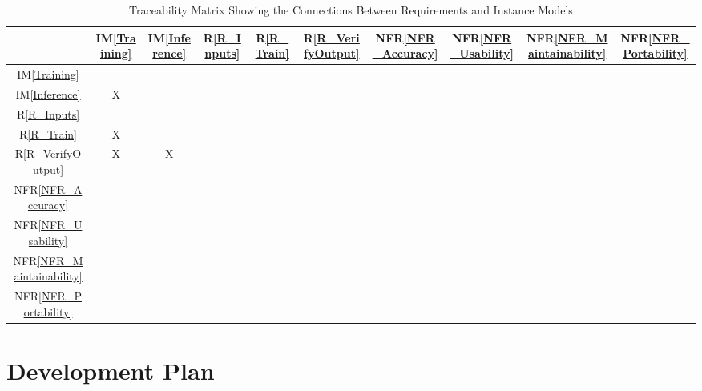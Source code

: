 \documentclass[12pt]{article}
\newcommand{\iref}[1]{IM\ref{#1}}
\newcommand{\rref}[1]{R\ref{#1}}
\newcommand{\nfrref}[1]{NFR\ref{#1}}
\begin{document}
\begin{table}[h!]
\centering
\begin{tabular}{|c|c|c|c|c|c|c|c|c|c|}
\hline
	& \iref{Training} & \iref{Inference} & \rref{R_Inputs} & \rref{R_Train} & \rref{R_VerifyOutput} & \nfrref{NFR_Accuracy} & \nfrref{NFR_Usability} & \nfrref{NFR_Maintainability} & \nfrref{NFR_Portability} \\
\hline
\iref{Training}            &  &  &  &  &  &  &  &  &  \\ \hline
\iref{Inference}           & X &  &  &  &  &  &  &  &  \\ \hline
\rref{R_Inputs}            &  &  &  &  &  &  &  &  &  \\ \hline
\rref{R_Train}             & X &  &  &  &  &  &  &  &  \\ \hline
\rref{R_VerifyOutput}      & X & X &  &  &  &  &  &  &  \\ \hline
\nfrref{NFR_Accuracy}      &  &  &  &  &  &  &  &  &  \\ \hline 
\nfrref{NFR_Usability}     &  &  &  &  &  &  &  &  &  \\ \hline
\nfrref{NFR_Maintainability} &  &  &  &  &  &  &  &  &  \\ \hline
\nfrref{NFR_Portability}   &  &  &  &  &  &  &  &  &  \\ \hline
\end{tabular}

\caption{Traceability Matrix Showing the Connections Between Requirements and Instance Models}
\label{Table:R_trace}
\end{table}





\section{Development Plan}
\end{document}
